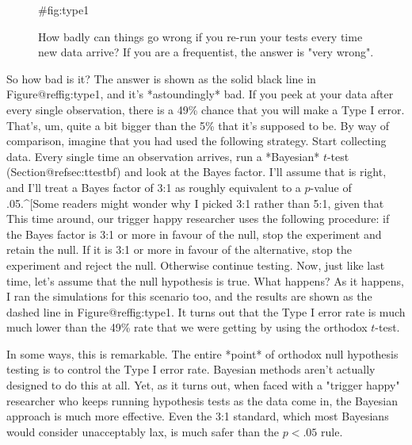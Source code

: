\begin{figure}[t]
\begin{center}
\caption{How badly can things go wrong if you re-run your tests every time new data arrive? If you are a frequentist, the answer is "very wrong".}
{#fig:type1}
\HR
\end{center}
\end{figure}

So how bad is it? The answer is shown as the solid black line in Figure@reffig:type1, and it's *astoundingly* bad. If you peek at your data after every single observation, there is a 49\% chance that you will make a Type I error. That's, um, quite a bit bigger than the 5\% that it's supposed to be. By way of comparison, imagine that you had used the following strategy. Start collecting data. Every single time an observation arrives, run a *Bayesian* $t$-test (Section@refsec:ttestbf) and look at the Bayes factor. I'll assume that  is right, and I'll treat a Bayes factor of 3:1 as roughly equivalent to a $p$-value of .05.^[Some readers might wonder why I picked 3:1 rather than 5:1, given that \citeA{Johnson2013] suggests that $p=.05$ lies somewhere in that range. I did so in order to be charitable to the $p$-value. If I'd chosen a 5:1 Bayes factor instead, the results would look even better for the Bayesian approach.} This time around, our trigger happy researcher uses the following procedure: if the Bayes factor is 3:1 or more in favour of the null, stop the experiment and retain the null. If it is 3:1 or more in favour of the alternative, stop the experiment and reject the null. Otherwise continue testing. Now, just like last time, let's assume that the null hypothesis is true. What happens? As it happens, I ran the simulations for this scenario too, and the results are shown as the dashed line in Figure@reffig:type1. It turns out that the Type I error rate is much much lower than the 49\% rate that we were getting by using the orthodox $t$-test.

In some ways, this is remarkable. The entire *point* of orthodox null hypothesis testing is to control the Type I error rate. Bayesian methods aren't actually designed to do this at all. Yet, as it turns out, when faced with a "trigger happy" researcher who keeps running hypothesis tests as the data come in, the Bayesian approach is much more effective. Even the 3:1 standard, which most Bayesians would consider unacceptably lax, is much safer than the $p<.05$ rule. 


